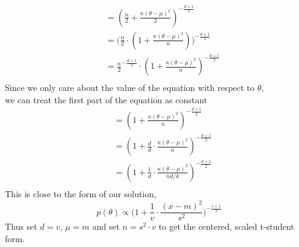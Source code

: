 \documentclass{homework}
\begin{document}
\begin{enumerate}[label=(\Alph*)]
\begin{equation}
\begin{split}
& = ( \frac{n}{2} + \frac{\kappa(\theta - \mu)^2}{2} )^{-\frac{d+1}{2}} \\
& = \big(\frac{n}{2} \cdot ( 1 + \frac{\kappa(\theta - \mu)^2}{n}) \big)^{-\frac{d+1}{2}} \\
& = \frac{n}{2}^{-\frac{d+1}{2}} \cdot ( 1 + \frac{\kappa(\theta - \mu)^2}{n})^{-\frac{d+1}{2}} \\
\end{split} \end{equation}
Since we only care about the value of the equation with respect to $\theta$, \\we can treat the first part of the equation as constant
\begin{equation} \begin{split}
& = ( 1 + \frac{\kappa(\theta - \mu)^2}{n})^{-\frac{d+1}{2}} \\
& = ( 1 + \frac{d}{d} \cdot \frac{\kappa(\theta - \mu)^2}{n})^{-\frac{d+1}{2}} \\
& = ( 1 + \frac{1}{d} \cdot \frac{\kappa(\theta - \mu)^2}{nd/k})^{-\frac{d+1}{2}} \\
\end{split} \end{equation}
This is close to the form of our solution, $$p(\theta) \propto \big( 1 + \frac{1}{v} \cdot \frac{(x-m)^2}{s^2}\big)^{-\frac{v+1}{2}}$$
Thus set $d = v$, $\mu = m$ and set $n = s^2 \cdot v$ to get the centered, scaled t-student form.


\end{enumerate}
\end{document}
